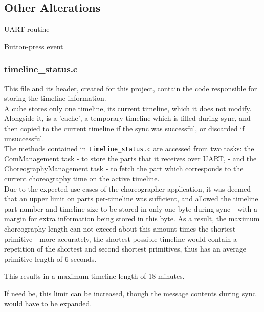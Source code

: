 \subsection{Other Alterations}

UART routine

Button-press event

\subsubsection{timeline\_status.c}

This file and its header, created for this project, contain the code responsible for storing the timeline information.\\

A cube stores only one timeline, its current timeline, which it does not modify. Alongside it, is a 'cache', a temporary timeline which is filled during sync, and then copied to the current timeline if the sync was successful, or discarded if unsuccessful.\\

The methods contained in \texttt{timeline\_status.c} are accessed from two tasks: the ComManagement task - to store the parts that it receives over UART, - and the ChoreographyManagement task - to fetch the part which corresponds to the current choreography time on the active timeline.\\

Due to the expected use-cases of the choreographer application, it was deemed that an upper limit on parts per-timeline was sufficient, and allowed the timeline part number and timeline size to be stored in only one byte during sync - with a margin for extra information being stored in this byte. As a result, the maximum choreography length can not exceed about this amount times the shortest primitive - more accurately, the shortest possible timeline would contain a repetition of the shortest and second shortest primitives, thus has an average primitive length of 6 seconds. 

This results in a maximum timeline length of 18 minutes. 

If need be, this limit can be increased, though the message contents during sync would have to be expanded.
    



